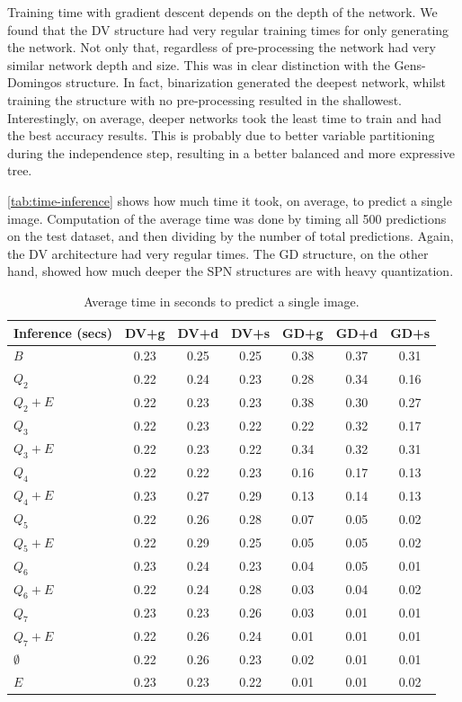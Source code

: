 Training time with gradient descent depends on the depth of the network. We found that the DV
structure had very regular training times for only generating the network. Not only that,
regardless of pre-processing the network had very similar network depth and size. This was in clear
distinction with the Gens-Domingos structure. In fact, binarization generated the deepest network,
whilst training the structure with no pre-processing resulted in the shallowest. Interestingly,
on average, deeper networks took the least time to train and had the best accuracy results. This is
probably due to better variable partitioning during the independence step, resulting in a better
balanced and more expressive tree.

\autoref{tab:time-inference} shows how much time it took, on average, to predict a single image.
Computation of the average time was done by timing all 500 predictions on the test dataset, and
then dividing by the number of total predictions.  Again, the DV architecture had very regular
times. The GD structure, on the other hand, showed how much deeper the SPN structures are with
heavy quantization.

\begin{table}[h]
  \centering
  \begin{tabular}{l|c|c|c|c|c|c}
    \hline
    \multicolumn{1}{c}{\bfseries Inference (secs)} & \multicolumn{1}{c}{\bfseries DV+g} &
    \multicolumn{1}{c}{\bfseries DV+d} & \multicolumn{1}{c}{\bfseries DV+s} &
    \multicolumn{1}{c}{\bfseries GD+g} & \multicolumn{1}{c}{\bfseries GD+d} &
    \multicolumn{1}{c}{\bfseries GD+s}\\
    \hline
    $B$         & 0.23 & 0.25 & 0.25 & 0.38 & 0.37 & 0.31 \\
    $Q_2$       & 0.22 & 0.24 & 0.23 & 0.28 & 0.34 & 0.16 \\
    $Q_2+E$     & 0.22 & 0.23 & 0.23 & 0.38 & 0.30 & 0.27 \\
    $Q_3$       & 0.22 & 0.23 & 0.22 & 0.22 & 0.32 & 0.17 \\
    $Q_3+E$     & 0.22 & 0.23 & 0.22 & 0.34 & 0.32 & 0.31 \\
    $Q_4$       & 0.22 & 0.22 & 0.23 & 0.16 & 0.17 & 0.13 \\
    $Q_4+E$     & 0.23 & 0.27 & 0.29 & 0.13 & 0.14 & 0.13 \\
    $Q_5$       & 0.22 & 0.26 & 0.28 & 0.07 & 0.05 & 0.02 \\
    $Q_5+E$     & 0.22 & 0.29 & 0.25 & 0.05 & 0.05 & 0.02 \\
    $Q_6$       & 0.23 & 0.24 & 0.23 & 0.04 & 0.05 & 0.01 \\
    $Q_6+E$     & 0.22 & 0.24 & 0.28 & 0.03 & 0.04 & 0.02 \\
    $Q_7$       & 0.23 & 0.23 & 0.26 & 0.03 & 0.01 & 0.01 \\
    $Q_7+E$     & 0.22 & 0.26 & 0.24 & 0.01 & 0.01 & 0.01 \\
    $\emptyset$ & 0.22 & 0.26 & 0.23 & 0.02 & 0.01 & 0.01 \\
    $E$         & 0.23 & 0.23 & 0.22 & 0.01 & 0.01 & 0.02 \\
  \end{tabular}
  \caption{Average time in seconds to predict a single image.\label{tab:time-inference}}
\end{table}
